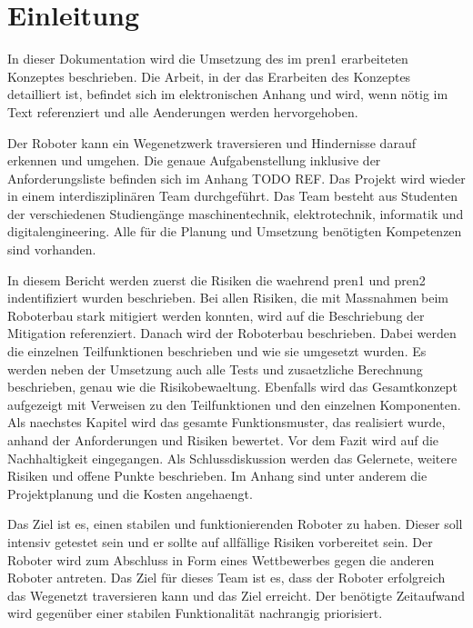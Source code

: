 \section{Einleitung}

In dieser Dokumentation wird die Umsetzung des im \acrfull{pren1} erarbeiteten Konzeptes beschrieben. 
Die Arbeit, in der das Erarbeiten des Konzeptes detailliert ist, befindet sich im elektronischen Anhang und wird, wenn nötig im Text referenziert und alle Aenderungen werden hervorgehoben.

Der Roboter kann ein Wegenetzwerk traversieren und Hindernisse darauf erkennen und umgehen. Die genaue Aufgabenstellung inklusive der Anforderungsliste befinden sich im Anhang TODO REF. Das Projekt wird wieder in einem interdisziplinären Team durchgeführt. Das Team besteht aus Studenten der verschiedenen Studiengänge \acrfull{maschinentechnik}, \acrfull{elektrotechnik}, \acrfull{informatik} und \acrfull{digitalengineering}. Alle für die Planung und Umsetzung benötigten Kompetenzen sind vorhanden.

In diesem Bericht werden zuerst die Risiken die waehrend \acrshort{pren1} und \acrshort{pren2} indentifiziert wurden beschrieben. Bei allen Risiken, die mit Massnahmen beim Roboterbau stark mitigiert werden konnten, wird auf die Beschriebung der Mitigation referenziert. Danach wird der Roboterbau beschrieben. Dabei werden die einzelnen Teilfunktionen beschrieben und wie sie umgesetzt wurden. Es werden neben der Umsetzung auch alle Tests und zusaetzliche Berechnung beschrieben, genau wie die Risikobewaeltung. Ebenfalls wird das Gesamtkonzept aufgezeigt mit Verweisen zu den Teilfunktionen und den einzelnen Komponenten. Als naechstes Kapitel wird das gesamte Funktionsmuster, das realisiert wurde, anhand der Anforderungen und Risiken bewertet. Vor dem Fazit wird auf die Nachhaltigkeit eingegangen. Als Schlussdiskussion werden das Gelernete, weitere Risiken und offene Punkte beschrieben. Im Anhang sind unter anderem die Projektplanung und die Kosten angehaengt.


Das Ziel ist es, einen stabilen und funktionierenden Roboter zu haben. Dieser soll intensiv getestet sein und er sollte auf allfällige Risiken vorbereitet sein. Der Roboter wird zum Abschluss in Form eines Wettbewerbes gegen die anderen Roboter antreten. Das Ziel für dieses Team ist es, dass der Roboter erfolgreich das Wegenetzt traversieren kann und das Ziel erreicht. Der benötigte Zeitaufwand wird gegenüber einer stabilen Funktionalität nachrangig priorisiert.
